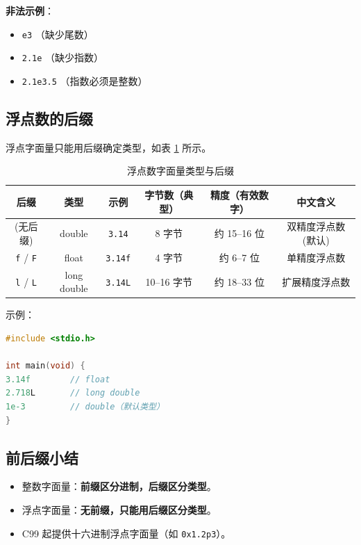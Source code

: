 \begin{enumerate}[label=(\arabic*), wide=0pt]
\textbf{非法示例}：
\begin{itemize}
    \item \verb|e3| （缺少尾数）
    \item \verb|2.1e| （缺少指数）
    \item \verb|2.1e3.5| （指数必须是整数）
\end{itemize}
\newpage


\subsection{浮点数的后缀}%

浮点字面量只能用后缀确定类型，如表 \ref{tab:float-suffix} 所示。

\begin{table}[h]
\centering
\caption{浮点数字面量类型与后缀}\label{tab:float-suffix}
\begin{tabular}{cccccc}
\hline
后缀 & 类型 & 示例 & 字节数（典型） & 精度（有效数字） & 中文含义 \\ \hline

(无后缀) & double & \verb|3.14| 
& 8 字节
& 约 15–16 位 
& 双精度浮点数(默认) \\

\verb|f| / \verb|F| & float & \verb|3.14f| 
& 4 字节
& 约 6–7 位 
& 单精度浮点数 \\

\verb|l| / \verb|L| & long double & \verb|3.14L| 
& 10–16 字节
& 约 18–33 位 
& 扩展精度浮点数 \\

\hline
\end{tabular}
\end{table}


示例：



\begin{lstlisting}[language=C,caption={浮点数后缀示例},label={code:float-suffix}]
#include <stdio.h>

int main(void) {
3.14f        // float
2.718L       // long double
1e-3         // double（默认类型）
}
\end{lstlisting}


\subsection{前后缀小结}

\begin{itemize}
    \item 整数字面量：\textbf{前缀区分进制，后缀区分类型}。
    \item 浮点字面量：\textbf{无前缀，只能用后缀区分类型}。
    \item C99 起提供十六进制浮点字面量（如 \verb|0x1.2p3|）。
\end{itemize}



\end{enumerate}
\newpage



